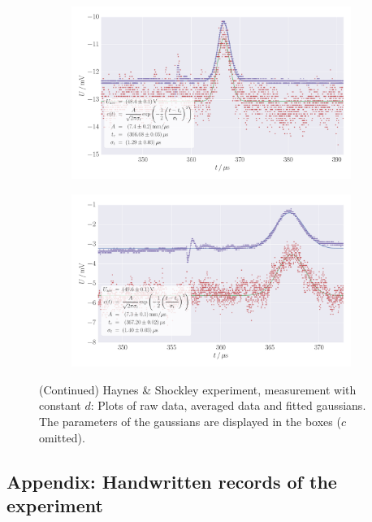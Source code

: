 \begin{figure}
    \centering
    \begin{subfigure}[b]{\pltw}
        \includegraphics[width=1.0\linewidth]{figures/haynes_shockley_raw_U_39}
        \caption{}
        \label{fig:h_s_raw_U_39}
    \end{subfigure}
    \begin{subfigure}[b]{\pltw}
        \includegraphics[width=1.0\linewidth]{figures/haynes_shockley_raw_U_65}
        \caption{}
        \label{fig:h_s_raw_U_65}
    \end{subfigure}
    \caption{
        (Continued)
        Haynes \& Shockley experiment, measurement with constant $d$:
        Plots of raw data, averaged data and fitted gaussians. 
        The parameters of the gaussians are displayed in the boxes 
        ($c$ omitted).
        }
    \label{fig:h_s_raw_plots_U_39_65}
\end{figure}

\subsection{Appendix: Handwritten records of the experiment}
    \label{sec:records_band_gap}
\clearpage

